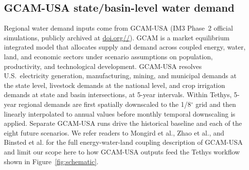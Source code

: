 \documentclass[fleqn,10pt]{wlscirep}
\begin{document}
\subsection*{GCAM-USA state/basin-level water demand}

Regional water demand inputs come from GCAM-USA (IM3 Phase~2 official simulations\cite{Zhao2024}, publicly archived at \href{https://doi.org/10.57931/2428940}{doi.org//})\cite{Zhao_gcamusa_water,Calvin2019GCAM,Binsted_2022}. GCAM is a market equilibrium integrated model that allocates supply and demand across coupled energy, water, land, and economic sectors under scenario assumptions on population, productivity, and technological development. GCAM-USA resolves U.S.\ electricity generation, manufacturing, mining, and municipal demands at the state level, livestock demands at the national level, and crop irrigation demands at state and basin intersections, at 5-year intervals. Within Tethys, 5-year regional demands are first spatially downscaled to the 1/8$^{\circ}$ grid and then linearly interpolated to annual values before monthly temporal downscaling is applied. Separate GCAM-USA runs drive the historical baseline and each of the eight future scenarios. We refer readers to Mongird et al.\cite{Mongird2025CERF}, Zhao et al.\cite{Zhao_gcamusa_water}, and Binsted et al.\cite{Binsted_2022} for the full energy-water-land coupling description of GCAM-USA and limit our scope here to how GCAM-USA outputs feed the Tethys workflow shown in Figure~\ref{fig:schematic}.
\end{document}
